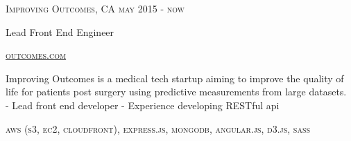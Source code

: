 {
    \textsc{\small{Improving Outcomes, CA
        \hfill
            {\raggedleft
                may 2015 - now
            } \\
        }
    }
    {\raggedright\large {
        Lead Front End Engineer
    } \\}

    \textsc{\small\href{http://www.outcomes.com}{outcomes.com}}

    \normalsize{\raggedright
        Improving Outcomes is a medical tech startup aiming to improve the quality of life for patients post surgery using predictive measurements from large datasets. \\
        - Lead front end developer
        - Experience developing RESTful api
    }

    \textsc{\small{\color{highlight}
        aws (s3, ec2, cloudfront),
        express.js,
        mongodb,
        angular.js,
        d3.js,
        sass
    }}
}
